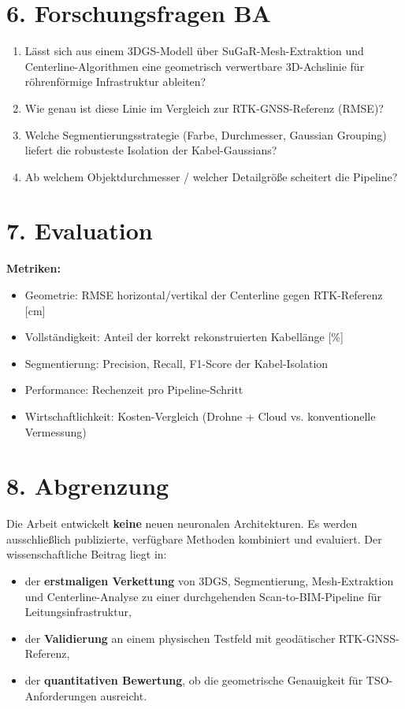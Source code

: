 \documentclass[11pt, a4paper]{article}
\begin{document}
\section*{6. Forschungsfragen BA}
\begin{enumerate}[noitemsep]
    \item Lässt sich aus einem 3DGS-Modell über SuGaR-Mesh-Extraktion und Centerline-Algorithmen eine geometrisch verwertbare 3D-Achslinie für röhrenförmige Infrastruktur ableiten?
    \item Wie genau ist diese Linie im Vergleich zur RTK-GNSS-Referenz (RMSE)?
    \item Welche Segmentierungsstrategie (Farbe, Durchmesser, Gaussian Grouping) liefert die robusteste Isolation der Kabel-Gaussians?
    \item Ab welchem Objektdurchmesser / welcher Detailgröße scheitert die Pipeline?
\end{enumerate}

\section*{7. Evaluation}
\textbf{Metriken:}
\begin{itemize}[noitemsep]
    \item Geometrie: RMSE horizontal/vertikal der Centerline gegen RTK-Referenz [cm]
    \item Vollständigkeit: Anteil der korrekt rekonstruierten Kabellänge [\%]
    \item Segmentierung: Precision, Recall, F1-Score der Kabel-Isolation
    \item Performance: Rechenzeit pro Pipeline-Schritt
    \item Wirtschaftlichkeit: Kosten-Vergleich (Drohne + Cloud vs. konventionelle Vermessung)
\end{itemize}

\section*{8. Abgrenzung}
Die Arbeit entwickelt \textbf{keine} neuen neuronalen Architekturen. Es werden ausschließlich publizierte, verfügbare Methoden kombiniert und evaluiert. Der wissenschaftliche Beitrag liegt in:
\begin{itemize}[noitemsep]
    \item der \textbf{erstmaligen Verkettung} von 3DGS, Segmentierung, Mesh-Extraktion und Centerline-Analyse zu einer durchgehenden Scan-to-BIM-Pipeline für Leitungsinfrastruktur,
    \item der \textbf{Validierung} an einem physischen Testfeld mit geodätischer RTK-GNSS-Referenz,
    \item der \textbf{quantitativen Bewertung}, ob die geometrische Genauigkeit für TSO-Anforderungen ausreicht.
\end{itemize}
\end{document}
